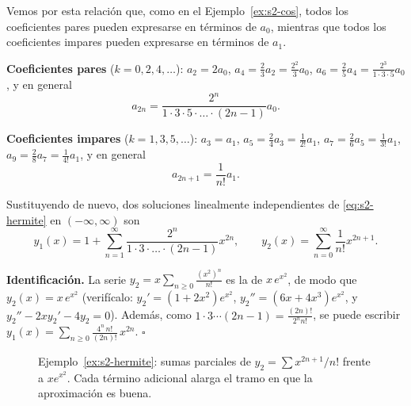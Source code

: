 \begin{example}
Vemos por esta relación que, como en el Ejemplo~\ref{ex:s2-cos}, todos los coeficientes pares pueden expresarse en términos de $a_0$, mientras que todos los coeficientes impares pueden expresarse en términos de $a_1$.
 
\vspace{0.2cm}
\noindent \textbf{Coeficientes pares} ($k=0,2,4,\dots$): $a_2 = 2a_0$, \; $a_4 = \frac{2}{3}a_2 = \frac{2^2}{3}a_0$, \; $a_6 = \frac{2}{5}a_4 = \frac{2^3}{1\cdot 3\cdot 5}a_0$, y en general
\[ a_{2n} = \frac{2^n}{1 \cdot 3 \cdot 5 \cdot \dots \cdot (2n - 1)}a_0. \]
 
\noindent \textbf{Coeficientes impares} ($k=1,3,5,\dots$): $a_3 = a_1$, \; $a_5 = \frac{2}{4}a_3 = \frac{1}{2!}a_1$, \; $a_7 = \frac{2}{6}a_5 = \frac{1}{3!}a_1$, \; $a_9 = \frac{2}{8}a_7 = \frac{1}{4!}a_1$, y en general
\[ a_{2n+1} = \frac{1}{n!}a_1. \]
 
Sustituyendo de nuevo, dos soluciones linealmente independientes de \eqref{eq:s2-hermite} en $(-\infty, \infty)$ son
\[ y_1(x) = 1 + \sum_{n=1}^{\infty} \frac{2^n}{1 \cdot 3 \cdot \dots \cdot (2n-1)}x^{2n}, \qquad y_2(x) = \sum_{n=0}^{\infty} \frac{1}{n!}x^{2n+1}. \]
 
\noindent\textbf{Identificación.} La serie $y_2=x\sum_{n\ge 0}\frac{(x^2)^n}{n!}$ es la de $x\,e^{x^2}$, de modo que $y_2(x)=x\,e^{x^2}$ (verifícalo: $y_2'=(1+2x^2)e^{x^2}$, $y_2''=(6x+4x^3)e^{x^2}$, y $y_2''-2xy_2'-4y_2=0$). Además, como $1\cdot3\cdots(2n-1)=\frac{(2n)!}{2^n n!}$, se puede escribir $y_1(x)=\sum_{n\ge 0}\frac{4^n\,n!}{(2n)!}\,x^{2n}$. \hfill $\square$
\end{example}
 
\begin{figure}[H]
\centering
{}
\caption{Ejemplo~\ref{ex:s2-hermite}: sumas parciales de $y_2=\sum x^{2n+1}/n!$ frente a $xe^{x^2}$. Cada término adicional alarga el tramo en que la aproximación es buena.}
\label{fig:s2-hermite}
\end{figure}
 
